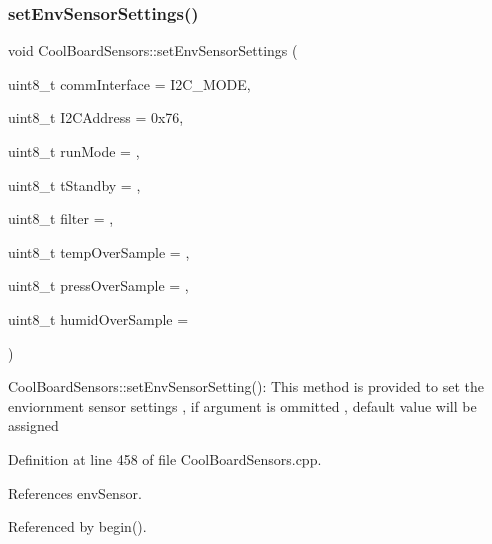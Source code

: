 \subsubsection{\texorpdfstring{set\+Env\+Sensor\+Settings()}{setEnvSensorSettings()}}
{\footnotesize\ttfamily void Cool\+Board\+Sensors\+::set\+Env\+Sensor\+Settings (\begin{DoxyParamCaption}\item[{uint8\+\_\+t}]{comm\+Interface = {\ttfamily I2C\+\_\+MODE},  }\item[{uint8\+\_\+t}]{I2\+C\+Address = {\ttfamily 0x76},  }\item[{uint8\+\_\+t}]{run\+Mode = {},  }\item[{uint8\+\_\+t}]{t\+Standby = {},  }\item[{uint8\+\_\+t}]{filter = {},  }\item[{uint8\+\_\+t}]{temp\+Over\+Sample = {},  }\item[{uint8\+\_\+t}]{press\+Over\+Sample = {},  }\item[{uint8\+\_\+t}]{humid\+Over\+Sample = {} }\end{DoxyParamCaption})}

Cool\+Board\+Sensors\+::set\+Env\+Sensor\+Setting()\+: This method is provided to set the enviornment sensor settings , if argument is ommitted , default value will be assigned 

Definition at line 458 of file Cool\+Board\+Sensors.\+cpp.



References env\+Sensor.



Referenced by begin().


